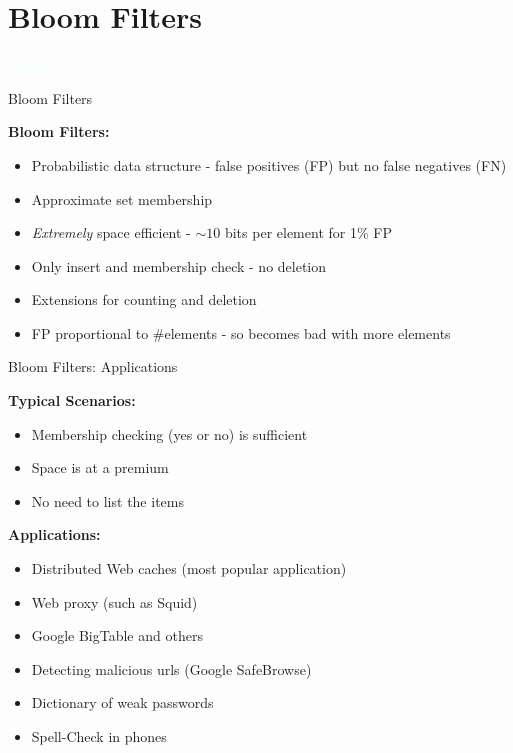 \documentclass{beamer}
\newcommand{\thblue}[1]{{\Huge {\textcolor{azure}{#1}}}}
\begin{document}
\section{Bloom Filters}
\begin{frame}{}
    \begin{center}
        \thblue{Bloom Filters}
    \end{center}
\end{frame}

\begin{frame}{Bloom Filters}

    {\bf Bloom Filters:}
    \begin{itemize}
        \item Probabilistic data structure - false positives (FP) but no false negatives (FN)
        \item Approximate set membership
        \item {\em Extremely} space efficient - $\sim 10$ bits per element for 1\% FP 
        \item Only insert and membership check - no deletion
        \item Extensions for counting and deletion
        \item FP proportional to \#elements - so becomes bad with more elements
    \end{itemize}
\end{frame}

\begin{frame}{Bloom Filters: Applications}

    {\bf Typical Scenarios:} 
    \begin{itemize}
        \item Membership checking (yes or no) is sufficient
        \item Space is at a premium
        \item No need to list the items 
    \end{itemize}

    {\bf Applications:}
    \begin{itemize}
        \item Distributed Web caches (most popular application)
        \item Web proxy (such as Squid)
        \item Google BigTable and others
        \item Detecting malicious urls (Google SafeBrowse)
        \item Dictionary of weak passwords
        \item Spell-Check in phones
    \end{itemize}
\end{frame}
\end{document}

